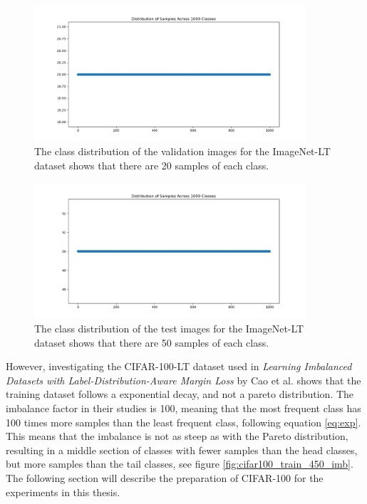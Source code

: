 \begin{figure}[h!]
    \centering
    \includegraphics[width=0.9\textwidth]{Images/Plots/class_distribution_val.png}
    \caption{The class distribution of the validation images for the ImageNet-LT dataset shows that there are 20 samples of each class.}
    \label{fig:IN-val}
\end{figure}

\begin{figure}[h!]
    \centering
    \includegraphics[width=0.9\textwidth]{Images/Plots/class_distribution_test.png}
    \caption{The class distribution of the test images for the ImageNet-LT dataset shows that there are 50 samples of each class.}
    \label{fig:IN-test}
\end{figure}


However, investigating the CIFAR-100-LT dataset used in \emph{Learning Imbalanced Datasets with Label-Distribution-Aware Margin Loss} by Cao et al. \cite{cao2019learningimbalanceddatasetslabeldistributionaware} shows that the training dataset follows a exponential decay, and not a pareto distribution. The imbalance factor in their studies is 100, meaning that the most frequent class has 100 times more samples than the least frequent class, following equation \eqref{eq:exp}. This means that the imbalance is not as steep as with the Pareto distribution, resulting in a middle section of classes with fewer samples than the head classes, but more samples than the tail classes, see figure \ref{fig:cifar100_train_450_imb}. The following section will describe the preparation of CIFAR-100 for the experiments in this thesis.


